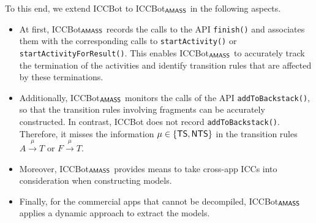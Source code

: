 To this end, we extend ICCBot to ICCBot$_{\textsf{AMASS}}$ in the following aspects. %
\begin{itemize}
\item At first, ICCBot$_{\textsf{AMASS}}$ %
records the calls to the API \texttt{finish()} and associates them with the corresponding calls to \texttt{startActivity()} or \texttt{startActivityForResult()}. This enables ICCBot$_{\textsf{AMASS}}$ to accurately track the termination of the activities and identify transition rules that are affected by these terminations. 
%
\item Additionally, ICCBot$_{\textsf{AMASS}}$ monitors the calls of the API \texttt{addToBackstack()}, so that the transition rules involving fragments can be accurately constructed. In contrast, ICCBot does not record \texttt{addToBackstack()}. Therefore, it misses the information $\mu \in \{{\sf TS}, {\sf NTS}\}$ in the transition rules $A \xrightarrow{\mu} T$ or $F \xrightarrow{\mu} T$.
%
\item Moreover, ICCBot$_{\textsf{AMASS}}$ provides means to take cross-app ICCs into consideration when constructing {\AMASS} models.
%
\item Finally, for the commercial apps that cannot be decompiled,  ICCBot$_{\textsf{AMASS}}$ applies a dynamic approach to extract the {\AMASS} models. 
\end{itemize}
%
%
%


